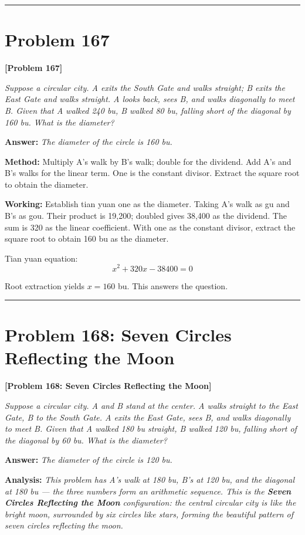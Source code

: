 \documentclass[11pt,a4paper]{book}
\newcommand{\answer}[1]{\noindent\textbf{\color{anacolor}Answer: }\textit{#1}\par}
\newcommand{\method}[1]{\noindent\textbf{\color{methodcolor}Method: }#1\par}
\newcommand{\working}[1]{\noindent\textbf{\color{workcolor}Working: }#1\par}
\newcommand{\analysis}[1]{\noindent\textbf{\color{anacolor}Analysis: }\textit{#1}\par}
\newcommand{\shortline}{\noindent\rule{0.5\textwidth}{0.4pt}\par}
\begin{document}
\shortline

\section{Problem 167}
\label{sec:prob167}

\noindent\textbf{\color{probcolor}[Problem 167]}

\textit{Suppose a circular city. A exits the South Gate and walks straight; B exits the East Gate and walks straight. A looks back, sees B, and walks diagonally to meet B. Given that A walked 240 bu, B walked 80 bu, falling short of the diagonal by 160 bu. What is the diameter?}

\answer{The diameter of the circle is 160 bu.}

\method{Multiply A's walk by B's walk; double for the dividend. Add A's and B's walks for the linear term. One is the constant divisor. Extract the square root to obtain the diameter.}

\working{Establish tian yuan one as the diameter. Taking A's walk as gu and B's as gou. Their product is 19,200; doubled gives 38,400 as the dividend. The sum is 320 as the linear coefficient. With one as the constant divisor, extract the square root to obtain 160 bu as the diameter.

Tian yuan equation:
$$x^2 + 320x - 38400 = 0$$

Root extraction yields $x = 160$ bu. This answers the question.}

\shortline

\section{Problem 168: Seven Circles Reflecting the Moon}
\label{sec:prob168}

\noindent\textbf{\color{probcolor}[Problem 168: Seven Circles Reflecting the Moon]}

\textit{Suppose a circular city. A and B stand at the center. A walks straight to the East Gate, B to the South Gate. A exits the East Gate, sees B, and walks diagonally to meet B. Given that A walked 180 bu straight, B walked 120 bu, falling short of the diagonal by 60 bu. What is the diameter?}

\answer{The diameter of the circle is 120 bu.}

\analysis{This problem has A's walk at 180 bu, B's at 120 bu, and the diagonal at 180 bu --- the three numbers form an arithmetic sequence. This is the \textbf{Seven Circles Reflecting the Moon} configuration: the central circular city is like the bright moon, surrounded by six circles like stars, forming the beautiful pattern of seven circles reflecting the moon.}
\end{document}
